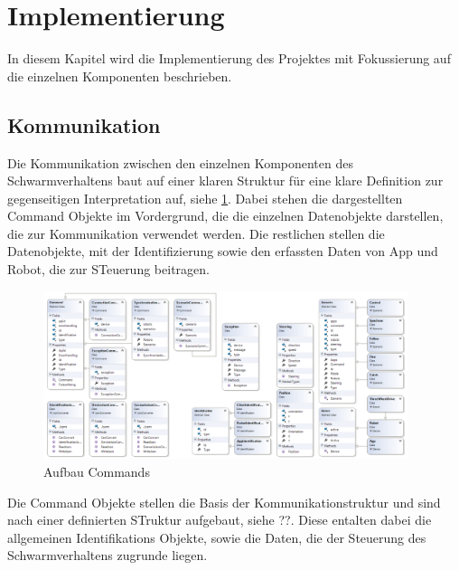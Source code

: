 \section{Implementierung}

In diesem Kapitel wird die Implementierung des Projektes mit Fokussierung auf die einzelnen Komponenten beschrieben.

\subsection{Kommunikation}

Die Kommunikation zwischen den einzelnen Komponenten des Schwarmverhaltens baut auf einer klaren Struktur für eine klare Definition zur gegenseitigen Interpretation auf, siehe \ref{fig:full_classdiagram}. Dabei stehen die dargestellten Command Objekte im Vordergrund, die die einzelnen Datenobjekte darstellen, die zur Kommunikation verwendet werden. Die restlichen stellen die Datenobjekte, mit der Identifizierung sowie den erfassten Daten von App und Robot, die zur STeuerung beitragen.

\begin{figure}[h]
	\begin{center}
		\includegraphics[width=0.95\textwidth]{images/uml/full_class_diagram.png}
	\end{center}
	\caption{Aufbau Commands}
	\label{fig:full_classdiagram}
\end{figure}

\newpage
Die Command Objekte stellen die Basis der Kommunikationstruktur und sind nach einer definierten STruktur aufgebaut, siehe ??. Diese entalten dabei die allgemeinen Identifikations Objekte, sowie die Daten, die der Steuerung des Schwarmverhaltens zugrunde liegen.

